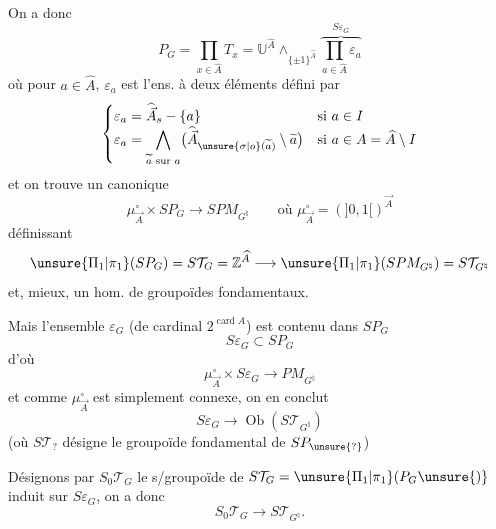 On a donc
\[
P_G=\prod_{x\in\widehat A}T_x
=\mathbb U^{\widehat A}\wedge_{\{\pm1\}^{\widehat A}}
\overbrace{\prod_{a\in\widehat A}\varepsilon_a}^{S\varepsilon_G}
\]
où pour $a\in\widehat A$, $\varepsilon_a$ est l'ens. à deux éléments défini par
\[
\begin{cases}
\varepsilon_a=\widehat{\vec A}_s-\{a\}&\text{si }a\in I\\
\varepsilon_a=\displaystyle\bigwedge_{\widetilde a\text{ sur }a}
\bigl(\widehat{\vec A}_{\unsure{\sigma|o}(\widetilde a)}\setminus\widetilde a\bigr)
&\text{si }a\in A=\widehat A\setminus I
\end{cases}
\]
et on trouve un   canonique
\[
\mu_{\vec A}^{\circ}\times SP_G\longrightarrow SPM_{G^\natural}
\qquad\text{où }\mu_{\vec A}^{\circ}=(]0,1[)^{\vec A}
\]
définissant
\[
\unsure{\Pi_1|\pi_1}(SP_G)=S\mathcal T_G=\mathbb Z^{\widehat A}
\longrightarrow\unsure{\Pi_1|\pi_1}(SPM_{G^\natural})=S\mathcal T_{G^\natural}
\]
et, mieux, un hom. de groupoïdes fondamentaux.

Mais  l'ensemble $\varepsilon_G$
(de cardinal $2^{\operatorname{card} A}$) est contenu dans $SP_G$
\[
S\varepsilon_G\subset SP_G
\]
d'où
\[
\mu_{\vec A}^{\circ}\times S\varepsilon_G\longrightarrow PM_{G^\natural}
\]
et comme $\mu_{\vec A}^{\circ}$ est simplement connexe, on en conclut
\[
S\varepsilon_G\longrightarrow\operatorname{Ob}(S\mathcal T_{G^\natural})
\]
(où $S\mathcal T_{?}$ désigne le groupoïde fondamental de $SP_{\unsure{?}}$)

Désignons par $S_0\mathcal T_G$ le s/groupoïde de $S\mathcal T_G=\unsure{\Pi_1|\pi_1}(P_G\unsure{)}$
induit sur $S\varepsilon_G$, on a donc
\[
S_0\mathcal T_G\longrightarrow S\mathcal T_{G^\natural}.
\]
